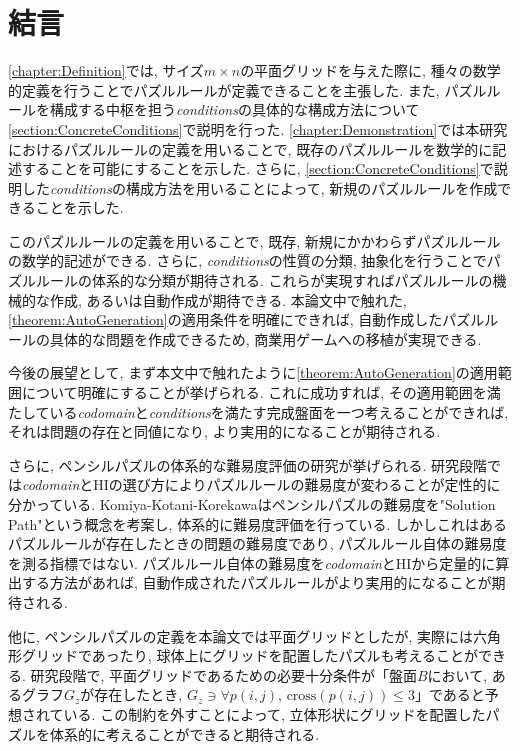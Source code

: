 \chapter{結言}
\cref{chapter:Definition}では, サイズ$m\times n$の平面グリッドを与えた際に, 種々の数学的定義を行うことでパズルルールが定義できることを主張した. また, パズルルールを構成する中枢を担う\textit{conditions}の具体的な構成方法について\cref{section:ConcreteConditions}で説明を行った. \cref{chapter:Demonstration}では本研究におけるパズルルールの定義を用いることで, 既存のパズルルールを数学的に記述することを可能にすることを示した. さらに, \cref{section:ConcreteConditions}で説明した\textit{conditions}の構成方法を用いることによって, 新規のパズルルールを作成できることを示した.

このパズルルールの定義を用いることで, 既存, 新規にかかわらずパズルルールの数学的記述ができる. さらに, \textit{conditions}の性質の分類, 抽象化を行うことでパズルルールの体系的な分類が期待される. これらが実現すればパズルルールの機械的な作成, あるいは自動作成が期待できる. 本論文中で触れた, \cref{theorem:AutoGeneration}の適用条件を明確にできれば, 自動作成したパズルルールの具体的な問題を作成できるため, 商業用ゲームへの移植が実現できる.

今後の展望として, まず本文中で触れたように\cref{theorem:AutoGeneration}の適用範囲について明確にすることが挙げられる. これに成功すれば, その適用範囲を満たしている\textit{codomain}と\textit{conditions}を満たす完成盤面を一つ考えることができれば, それは問題の存在と同値になり, より実用的になることが期待される.

さらに, ペンシルパズルの体系的な難易度評価の研究が挙げられる. 研究段階では\textit{codomain}とHIの選び方によりパズルルールの難易度が変わることが定性的に分かっている. Komiya-Kotani-Korekawa\cite{Komiya2010}はペンシルパズルの難易度を"Solution Path"という概念を考案し, 体系的に難易度評価を行っている. しかしこれはあるパズルルールが存在したときの問題の難易度であり, パズルルール自体の難易度を測る指標ではない. パズルルール自体の難易度を\textit{codomain}とHIから定量的に算出する方法があれば, 自動作成されたパズルルールがより実用的になることが期待される.

他に, ペンシルパズルの定義を本論文では平面グリッドとしたが, 実際には六角形グリッドであったり, 球体上にグリッドを配置したパズルも考えることができる. 研究段階で, 平面グリッドであるための必要十分条件が「盤面$B$において, あるグラフ$G_z$が存在したとき, $G_z \ni \forall p(i,j)$, $\text{cross}(p(i,j))\le3$」であると予想されている. この制約を外すことによって, 立体形状にグリッドを配置したパズルを体系的に考えることができると期待される.